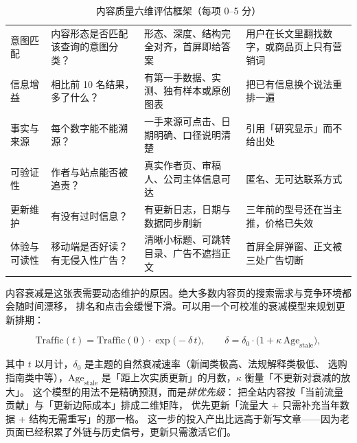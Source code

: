 \begin{table}[htbp]
\centering
\caption{内容质量六维评估框架（每项 0--5 分）}
\label{tab:contentquality}
\small
\begin{tabularx}{\textwidth}{L{2.3cm} L{3.4cm} L{3.2cm} Y}
\toprule
{} &  &  &  \\
\midrule
意图匹配 & 内容形态是否匹配该查询的意图分类？ & 形态、深度、结构完全对齐，首屏即给答案 & 用户在长文里翻找数字，或商品页上只有营销词 \\
信息增益 & 相比前 10 名结果，多了什么？ & 有第一手数据、实测、独有样本或原创图表 & 把已有信息换个说法重排一遍 \\
事实与来源 & 每个数字能不能溯源？ & 一手来源可点击、日期明确、口径说明清楚 & 引用「研究显示」而不给出处 \\
可验证性 & 作者与站点能否被追责？ & 真实作者页、审稿人、公司主体信息可达 & 匿名、无可达联系方式 \\
更新维护 & 有没有过时信息？ & 有更新日志，日期与数据同步刷新 & 三年前的型号还在当主推，价格已失效 \\
体验与可读性 & 移动端是否好读？有无侵入性广告？ & 清晰小标题、可跳转目录、广告不遮挡正文 & 首屏全屏弹窗、正文被三处广告切断 \\
\bottomrule
\end{tabularx}
\end{table}

内容衰减是这张表需要动态维护的原因。绝大多数内容页的搜索需求与竞争环境都会随时间漂移，
排名和点击会缓慢下滑。可以用一个可校准的衰减模型来规划更新排期：

\begin{equation}
\text{Traffic}(t) = \text{Traffic}(0) \cdot \exp\big(-\delta \, t \big) ,
\qquad \delta = \delta_0 \cdot \big(1 + \kappa \, \text{Age}_{\text{stale}}\big) ,
\label{eq:contentdecay}
\end{equation}

其中 $t$ 以月计，$\delta_0$ 是主题的自然衰减速率（新闻类极高、法规解释类极低、
选购指南类中等），$\text{Age}_{\text{stale}}$ 是「距上次实质更新」的月数，$\kappa$ 衡量「不更新对衰减的放大」。
这个模型的用法不是精确预测，而是\emph{排优先级}：
把全站内容按「当前流量贡献」与「更新边际成本」排成二维矩阵，
优先更新「流量大 + 只需补充当年数据 + 结构无需重写」的那一格。
这一步的投入产出比远高于新写文章——因为老页面已经积累了外链与历史信号，更新只需激活它们。

